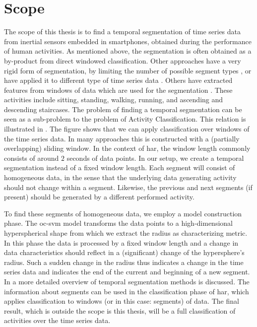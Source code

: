 \section{Scope}
The scope of this thesis is to find a temporal segmentation of time series data from inertial sensors embedded in smartphones, obtained during the performance of human activities.
As mentioned above, the segmentation is often obtained as a by-product from direct windowed classification.
Other approaches have a very rigid form of segmentation, \eg by limiting the number of possible segment types \cite{himberg2001time,chamroukhi2013joint}, or have applied it to different type of time series data \cite{li2007segmentation,fuchs2010online,guenterberg2009automatic}.
Others have extracted features from windows of data which are used for the segmentation \cite{guo2012adaptive}.
These activities include sitting, standing, walking, running, and ascending and descending staircases.
The problem of finding a temporal segmentation can be seen as a sub-problem to the problem of Activity Classification.
This relation is illustrated in .
The figure shows that we can apply classification over windows of the time series data.
In many approaches this is constructed with a (partially overlapping) sliding window.
In the context of \gls{har}, the window length commonly consists of around $2$ seconds of data points.
In our setup, we create a temporal segmentation instead of a fixed window length.
Each segment will consist of homogeneous data, in the sense that the underlying data generating activity should not change within a segment.
Likewise, the previous and next segments (if present) should be generated by a different performed activity.

To find these segments of homogeneous data, we employ a model construction phase.
The \gls{oc-svm} model transforms the data points to a high-dimensional hyperspherical shape from which we extract the radius as characterizing metric.
In this phase the data is processed by a fixed window length and a change in data characteristics should reflect in a (significant) change of the hypersphere's radius.
Such a sudden change in the radius thus indicates a change in the time series data and indicates the end of the current and beginning of a new segment.
In  a more detailed overview of temporal segmentation methods is discussed.
The information about segments can be used in the classification phase of \gls{har}, which applies classification to windows (or in this case: segments) of data.
The final result, which is outside the scope is this thesis, will be a full classification of activities over the time series data.

